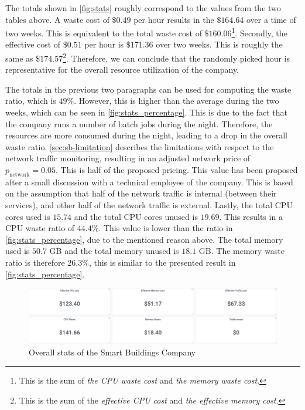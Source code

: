 \noindent
The totals shown in \autoref{fig:stats} roughly correspond to the values from the two tables above. A waste cost of $\$0.49$ per hour results in the $\$164.64$ over a time of two weeks. This is equivalent to the total waste cost of $\$160.06$\footnote{This is the sum of \textit{the CPU waste cost} and \textit{the memory waste cost}.}. Secondly, the effective cost of $\$0.51$ per hour is $\$171.36$ over two weeks. This is roughly the same as $\$174.57$\footnote{This is the sum of the \textit{effective CPU cost} and \textit{the effective memory cost}.}. Therefore, we can conclude that the randomly picked hour is representative for the overall resource utilization of the company.


\noindent
The totals in the previous two paragraphs can be used for computing the waste ratio, which is $49\%$. However, this is higher than the average during the two weeks, which can be seen in \autoref{fig:stats_percentage}. This is due to the fact that the company runs a number of batch jobs during the night. Therefore, the resources are more consumed during the night, leading to a drop in the overall waste ratio. \autoref{sec:sb-limitation} describes the limitations with respect to the network traffic monitoring, resulting in an adjusted network price of $p_\text{network} = 0.05$. This is half of the proposed pricing. This value has been proposed after a small discussion with a technical employee of the company. This is based on the assumption that half of the network traffic is internal (between their services), and other half of the network traffic is external. Lastly, the total CPU cores used is $15.74$ and the total CPU cores unused is $19.69$. This results in a CPU waste ratio of $44.4\%$. This value is lower than the ratio in \autoref{fig:stats_percentage}, due to the mentioned reason above. The total memory used is $50.7$ GB and the total memory unused is $18.1$ GB. The memory waste ratio is therefore $26.3\%$, this is similar to the presented result in \autoref{fig:stats_percentage}.

\begin{figure}
    \centering
    \includegraphics[width=\textwidth]{gfx/stats.png}
    \caption{Overall stats of the Smart Buildings Company}
    \label{fig:stats}
\end{figure}

